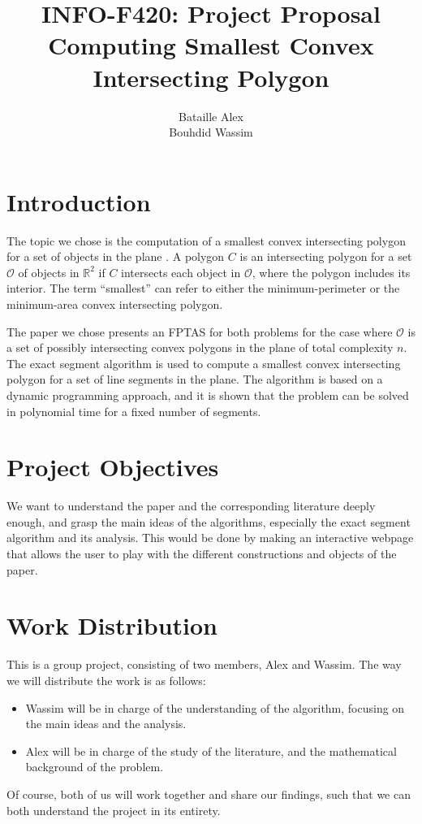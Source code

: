 \documentclass{article}
\title{INFO-F420: Project Proposal \\ Computing Smallest Convex Intersecting Polygon}
\author{Bataille Alex\\ Bouhdid Wassim}
\begin{document}
\maketitle
\section{Introduction}
The topic we chose is the computation of a smallest convex intersecting polygon for a set of objects in the plane \cite{Antoniadis_deBerg_Kisfaludi-Bak_Skarlatos_2025}. 
A polygon $C$ is an intersecting polygon for a set $\mathcal{O}$ of objects in $\mathbb{R}^2$ if $C$ intersects each object in $\mathcal{O}$, where the polygon includes 
its interior. The term ``smallest'' can refer to either the minimum-perimeter or the minimum-area convex intersecting polygon. 

The paper we chose \cite{Antoniadis_deBerg_Kisfaludi-Bak_Skarlatos_2025} presents an FPTAS for both problems for the case where $\mathcal{O}$ is a set of possibly intersecting convex polygons in the plane of total complexity $n$.
The exact segment algorithm is used to compute a smallest convex intersecting polygon for a set of line segments in the plane. The algorithm is based on a dynamic programming approach, and it is shown that the problem can be solved in polynomial time for a fixed number of segments.

\section{Project Objectives}
We want to understand the paper and the corresponding literature deeply enough, and grasp the main ideas of the algorithms, especially the exact segment 
algorithm and its analysis. 
This would be done by making an interactive webpage that allows the user to play with the different constructions and objects of the paper. 

\section{Work Distribution}
This is a group project, consisting of two members, Alex and Wassim. The way we will distribute the work is as follows: 
\begin{itemize}
    \item Wassim will be in charge of the understanding of the algorithm, focusing on the main ideas and the analysis.
    \item Alex will be in charge of the study of the literature, and the mathematical background of the problem.
\end{itemize}
Of course, both of us will work together and share our findings, such that we can both understand the project in its entirety. 

{}

\end{document}
